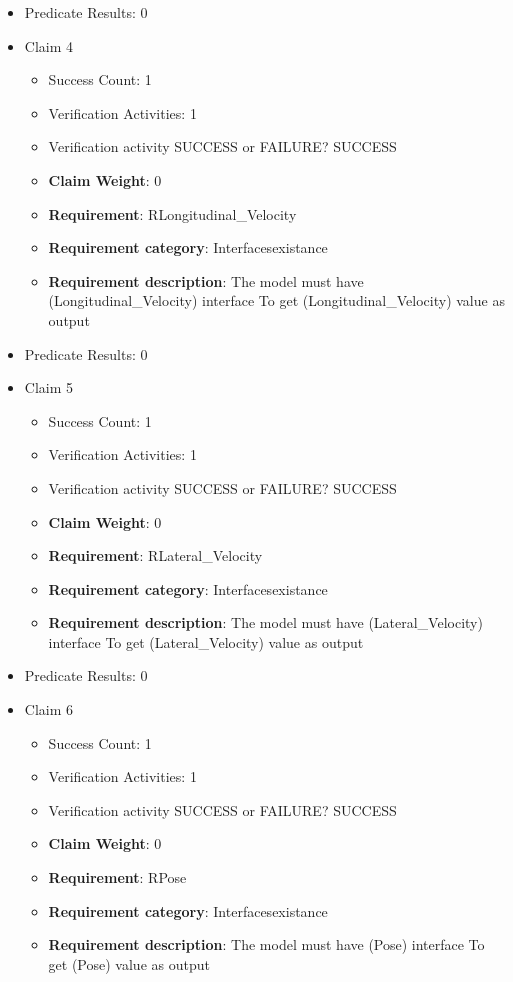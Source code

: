 \documentclass{article}
\begin{document}
\begin{itemize}
\begin{itemize}
				\end{itemize}
				
									    
				\item Predicate Results: 0

  				  \item Claim 4
				\begin{itemize}
			    	\item Success Count: 1 
			    	\item Verification Activities: 1
					\item Verification activity SUCCESS or FAILURE? SUCCESS
					\item \textbf{Claim Weight}: 0
						\item \textbf{Requirement}: RLongitudinal_Velocity 
						\item \textbf{Requirement category}: Interfacesexistance 
						\item \textbf{Requirement description}: The model must have (Longitudinal_Velocity) interface To get (Longitudinal_Velocity) value as output
					
				\end{itemize}
				
									    
				\item Predicate Results: 0

  				  \item Claim 5
				\begin{itemize}
			    	\item Success Count: 1 
			    	\item Verification Activities: 1
					\item Verification activity SUCCESS or FAILURE? SUCCESS
					\item \textbf{Claim Weight}: 0
						\item \textbf{Requirement}: RLateral_Velocity 
						\item \textbf{Requirement category}: Interfacesexistance 
						\item \textbf{Requirement description}: The model must have (Lateral_Velocity) interface To get (Lateral_Velocity) value as output
					
				\end{itemize}
				
									    
				\item Predicate Results: 0

  				  \item Claim 6
				\begin{itemize}
			    	\item Success Count: 1 
			    	\item Verification Activities: 1
					\item Verification activity SUCCESS or FAILURE? SUCCESS
					\item \textbf{Claim Weight}: 0
						\item \textbf{Requirement}: RPose 
						\item \textbf{Requirement category}: Interfacesexistance 
						\item \textbf{Requirement description}: The model must have (Pose) interface To get (Pose) value as output
					

\end{itemize}
\end{itemize}
\end{document}

